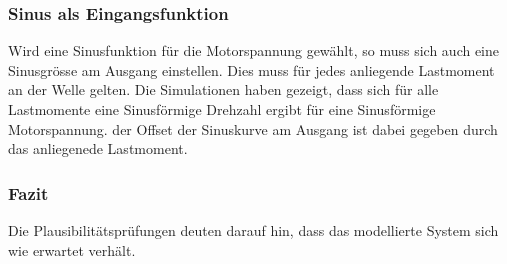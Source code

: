 \subsubsection{Sinus als Eingangsfunktion}
Wird eine Sinusfunktion für die Motorspannung gewählt, so muss sich auch
eine Sinusgrösse am Ausgang einstellen. Dies muss für jedes anliegende
Lastmoment an der Welle gelten. Die Simulationen haben gezeigt, dass sich
für alle Lastmomente eine Sinusförmige Drehzahl ergibt für eine Sinusförmige
Motorspannung. der Offset der Sinuskurve am Ausgang ist dabei gegeben durch
das anliegenede Lastmoment.

\subsubsection{Fazit}
Die Plausibilitätsprüfungen deuten darauf hin, dass das modellierte System
sich wie erwartet verhält.

